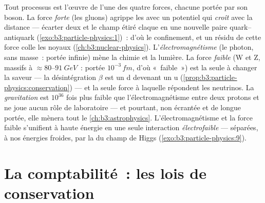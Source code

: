 \begin{remark}\label{rem:b3:particle-physics:forces}
Tout processus est l'œuvre de l'une des quatre forces, chacune portée
par son boson. La force \emph{forte} (les gluons) agrippe les 
avec un potentiel qui \emph{croît} avec la distance --- écarter deux
 et le champ étiré claque en une nouvelle paire
quark--antiquark (\cref{exo:b3:particle-physics:1})~: d'où le
confinement, et un résidu de cette force colle les noyaux
(\cref{ch:b3:nuclear-physics}). L'\emph{électromagnétisme} (le
photon, sans masse~: portée infinie) mène la chimie et la lumière. La
force \emph{faible} (W et Z, massifs à
$\approx80$--$\qty{91}{GeV}$~: portée $10^{-3}\,\unit{fm}$, d'où
«~faible~») est la seule à changer la saveur --- la désintégration
$\beta$ est un  d devenant un u
(\cref{prop:b3:particle-physics:conservation}) --- et la seule force
à laquelle répondent les neutrinos. La \emph{gravitation} est
$10^{36}$ fois plus faible que l'électromagnétisme entre deux protons
et ne joue aucun rôle de laboratoire --- et pourtant, non écrantée et
de longue portée, elle mènera tout le
\cref{ch:b3:astrophysics}. L'électromagnétisme et la force faible
s'unifient à haute énergie en une seule interaction
\emph{électrofaible} --- séparées, à nos énergies froides, par la
 du champ de Higgs
(\cref{exo:b3:particle-physics:9}).
\end{remark}

\section{La comptabilité~: les lois de conservation}

